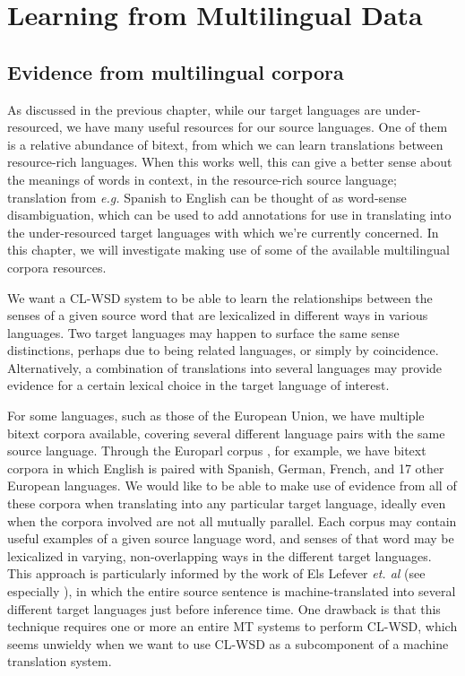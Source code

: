 \chapter{Learning from Multilingual Data}
\label{chap:multilingual}

\section{Evidence from multilingual corpora}
As discussed in the previous chapter, while our target languages are
under-resourced, we have many useful resources for our source languages. One of
them is a relative abundance of bitext, from which we can learn translations
between resource-rich languages. When this works well, this can give a better
sense about the meanings of words in context, in the resource-rich source
language; translation from \emph{e.g.} Spanish to English can be thought of as
word-sense disambiguation, which can be used to add annotations for use in
translating into the under-resourced target languages with which we're
currently concerned. In this chapter, we will investigate making use of some of
the available multilingual corpora resources.

We want a CL-WSD system to be able to learn the relationships between the
senses of a given source word that are lexicalized in different ways in various
languages.
Two target languages may happen to surface the same sense distinctions, perhaps
due to being related languages, or simply by coincidence.
Alternatively, a combination of translations into several languages may provide
evidence for a certain lexical choice in the target language of interest.

For some languages, such as those of the European Union, we have multiple
bitext corpora available, covering several different language pairs with the
same source language. Through the Europarl corpus \cite{europarl}, for example,
we have bitext corpora in which English is paired with Spanish, German, French,
and 17 other European languages.
We would like to be able to make use of evidence from all of these corpora when
translating into any particular target language, ideally even when the corpora
involved are not all mutually parallel.
Each corpus may contain useful examples of a given source language word,
and senses of that word may be lexicalized in varying, non-overlapping ways in
the different target languages.
This approach is particularly informed by the work of Els Lefever
\emph{et. al} (see especially \cite{lefever-hoste-decock:2011:ACL-HLT2011}), in
which the entire source sentence is machine-translated into several different
target languages just before inference time. One drawback is that this
technique requires one or more an entire MT systems to perform CL-WSD, which
seems unwieldy when we want to use CL-WSD as a subcomponent of a machine
translation system.

